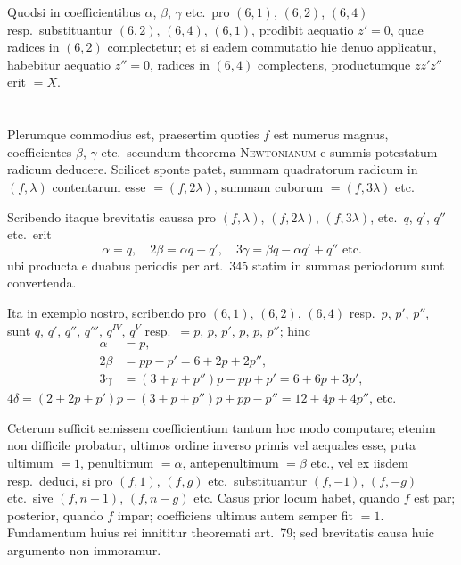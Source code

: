 \documentclass[12pt,a4paper]{article}
\theoremstyle{plain}
\theoremstyle{definition}
\theoremstyle{remark}
\begin{document}
Quodsi in coefficientibus $\alpha$, $\beta$, $\gamma$ etc.\ pro $(6,1)$, $(6,2)$, $(6,4)$ resp.\ substituantur $(6,2)$, $(6,4)$, $(6,1)$, prodibit aequatio $z'=0$, quae radices in $(6,2)$ complectetur; et si eadem commutatio hie denuo applicatur, habebitur aequatio $z''=0$, radices in $(6,4)$ complectens, productumque $zz'z''$ erit $=X$.

\section{}

Plerumque commodius est, praesertim quoties $f$ est numerus magnus, coefficientes $\beta$, $\gamma$ etc.\ secundum theorema \textsc{Newtonianum} e summis potestatum radicum deducere. Scilicet sponte patet, summam quadratorum radicum in $(f,\lambda)$ contentarum esse $=(f,2\lambda)$, summam cuborum $=(f,3\lambda)$ etc.

Scribendo itaque brevitatis caussa pro $(f,\lambda)$, $(f,2\lambda)$, $(f,3\lambda)$, etc.\ $q$, $q'$, $q''$ etc.\ erit
\[\alpha=q,\quad 2\beta=\alpha q-q',\quad 3\gamma=\beta q-\alpha q'+q''\text{ etc.}\]
ubi producta e duabus periodis per art.\ 345 statim in summas periodorum sunt convertenda.

Ita in exemplo nostro, scribendo pro $(6,1)$, $(6,2)$, $(6,4)$ resp.\ $p$, $p'$, $p''$, sunt $q$, $q'$, $q''$, $q'''$, $q^{IV}$, $q^V$ resp.\ $=p$, $p$, $p'$, $p$, $p$, $p''$; hinc
\begin{align*}
\alpha&=p,\\
2\beta&=pp-p'=6+2p+2p'',\\
3\gamma&=(3+p+p'')p-pp+p'=6+6p+3p',
\end{align*}
$4\delta=(2+2p+p')p-(3+p+p'')p+pp-p''=12+4p+4p''$, etc.

Ceterum sufficit semissem coefficientium tantum hoc modo computare; etenim non difficile probatur, ultimos ordine inverso primis vel aequales esse, puta ultimum $=1$, penultimum $=\alpha$, antepenultimum $=\beta$ etc., vel ex iisdem resp.\ deduci, si pro $(f,1)$, $(f,g)$ etc.\ substituantur $(f,-1)$, $(f,-g)$ etc.\ sive $(f,n-1)$, $(f,n-g)$ etc. Casus prior locum habet, quando $f$ est par; posterior, quando $f$ impar; coefficiens ultimus autem semper fit $=1$. Fundamentum huius rei innititur theoremati art.\ 79; sed brevitatis causa huic argumento non immoramur.

\section{}
\end{document}
